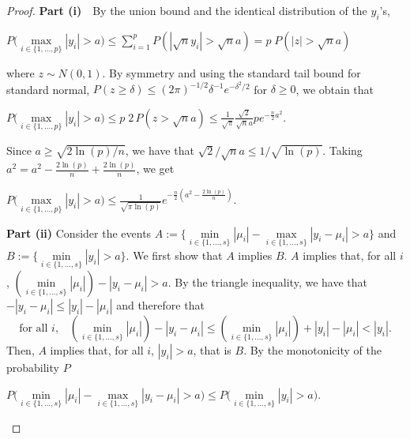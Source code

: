 \documentclass[bj,authoryear]{imsart}
\theoremstyle{plain}
\begin{document}
\begin{proof}

\textbf{Part (i)} \,\, By the union bound and the identical distribution of the $y_i$'s,
\begin{center}
    $P\Big(\underset{i\in\{1,\ldots,p\}}{\max}|y_i|> a \Big)     \leq \sum_{i=1}^{p}{ P\left(|\sqrt{n}y_i|>\sqrt{n}a \right)}
    = p\; P\left(|z|>\sqrt{n}a\right)$
\end{center}
    where $z\sim N(0,1)$. 
    By symmetry and using the standard tail bound for standard normal, $P(z \geq \delta) \leq (2\pi)^{-1/2} \delta^{-1} e^{-\delta^{2} / 2}$ for $\delta \geq 0$, we obtain that 
\begin{center}
  $P\Big(\underset{i\in\{1,\ldots,p\}}{\max}|y_i|> a \Big) 
     \leq  p\; 2 \, P\left(z>\sqrt{n}a\right) \leq \frac{1}{\sqrt{\pi}}\frac{\sqrt{2}}{\sqrt{n}a}p e^{-\frac{n}{2} a^{2}}.$
\end{center}
Since $a \geq \sqrt{2\ln(p)/n}$, we have that $\sqrt{2}/\sqrt{n}a\leq 1/\sqrt{\ln(p)}$. Taking $a^2=a^2-\frac{2\ln(p)}{n}+\frac{2\ln(p)}{n}$, we get \begin{center}
$ P\Big(\underset{i\in\{1,\ldots,p\}}{\max}|y_i|> a \Big) \leq \frac{1}{\sqrt{\pi\ln(p)}} e^{-\frac{n}{2} \left(a^{2}-\frac{2\ln(p)}{n}\right)}.$ \\\end{center}

\textbf{Part (ii)} Consider the events $A:=\{ \underset{i \in \{1,\ldots,s\}}{\min}|\mu_i|- \underset{i \in \{1,\ldots,s\}}{\max}|y_i-\mu_i| > a\}$ and $B:=\{\underset{i \in \{1,\ldots,s\}}{\min}|y_i| > a\}$. We first show that $A$ implies $B$. $A$ implies that, for all $i$, $(\underset{i \in \{1,\ldots,s\}}{\min}|\mu_i|) - |y_i-\mu_i| > a $.  By the triangle inequality, we have that $ -|y_i-\mu_i|\leq|y_i|-|\mu_i|$ and therefore that $$ \text{for all } i, \;\;\;(\min_{i \in \{1,\ldots,s\}}|\mu_i|) - |y_i-\mu_i| \leq  (\min_{i \in \{1,\ldots,s\}}|\mu_i|) +|y_i| - |\mu_i| < |y_i|.$$ 
Then, $A$ 
implies that, for all $i$, $|y_i| > a $, that is $B$. By the monotonicity of the probability $P$
\begin{center}$ P\Big(\underset{i \in \{1,\ldots,s\}}{\min}|\mu_i|-\underset{i \in \{1,\ldots,s\}}{\max}|y_i-\mu_i| > a\Big) \leq P\Big(\underset{i \in \{1,\ldots,s\}}{\min}|y_i| > a\Big) $. \end{center}



\end{proof}
\end{document}
